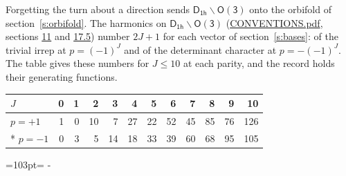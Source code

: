 \documentclass[10pt,a4paper]{article}
\newcommand{\needspace}[1]{\par\penalty-100\begingroup\dimen0=#1\relax\dimen2=\pagegoal
  \advance\dimen2-\pagetotal\ifdim\dimen0>\dimen2\relax\ifdim\dimen2>0pt\vfil\break\fi\fi
  \endgroup}
\numberwithin{equation}{section}
\newcommand{\grp}[1]{\mathsf{#1}}
\begin{document}
Forgetting the turn about a direction sends $\grp{D_{1h}}\backslash\grp{O(3)}$ onto the orbifold of section~\ref{s:orbifold}.
The harmonics on $\grp{D_{1h}}\backslash\grp{O(3)}$ (\href{../../CONVENTIONS.pdf}{CONVENTIONS.pdf}, sections \href{../../CONVENTIONS.pdf\#conv.11}{11} and \href{../../CONVENTIONS.pdf\#conv.17.5}{17.5}) number $2J + 1$ for each vector of section~\ref{s:bases}: of the trivial irrep at $p = (-1)^J$ and of the determinant character at $p = -(-1)^J$. The table gives these numbers for $J \le 10$ at each parity, and the record holds their generating functions.
{\small\setlength{\tabcolsep}{4pt}\begin{longtable}{@{}lrrrrrrrrrrr@{}}\toprule
$J$ & 0 & 1 & 2 & 3 & 4 & 5 & 6 & 7 & 8 & 9 & 10\\\midrule\endhead
\bottomrule\endfoot\endlastfoot
$p = +1$ & 1 & 0 & 10 & 7 & 27 & 22 & 52 & 45 & 85 & 76 & 126\\*
$p = -1$ & 0 & 3 & 5 & 14 & 18 & 33 & 39 & 60 & 68 & 95 & 105\\
\bottomrule\end{longtable}}
\needspace{103pt}
\end{document}
